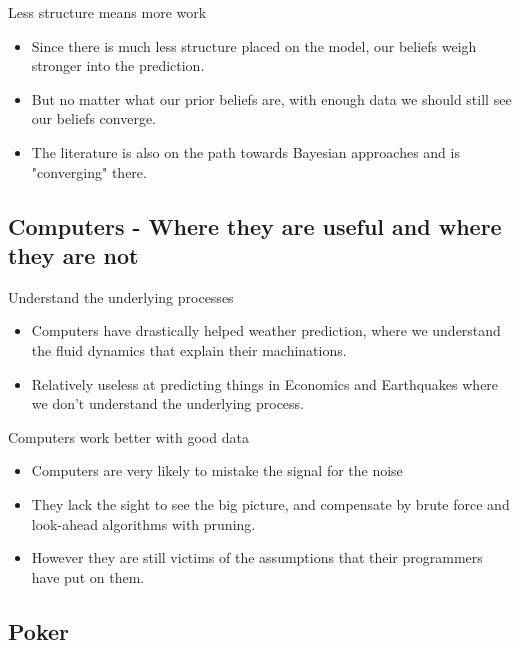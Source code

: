 \documentclass[bigger]{beamer}
\begin{document}
\begin{frame}[label=sec-4-1-4]{Less structure means more work}
\begin{itemize}
\item Since there is much less structure placed on the model, our beliefs
weigh stronger into the prediction.
\item But no matter what our prior beliefs are, with enough data we should
still see our beliefs converge.
\item The literature is also on the path towards Bayesian approaches and
is "converging" there.
\end{itemize}
\end{frame}

\subsection{Computers - Where they are useful and where they are not}
\label{sec-4-2}

\begin{frame}[label=sec-4-2-1]{Understand the underlying processes}
\begin{itemize}
\item Computers have drastically helped weather prediction, where we
understand the fluid dynamics that explain their machinations.
\item Relatively useless at predicting things in Economics and Earthquakes
where we don't understand the underlying process.
\end{itemize}
\end{frame}

\begin{frame}[label=sec-4-2-2]{Computers work better with good data}
\begin{itemize}
\item Computers are very likely to mistake the signal for the noise
\item They lack the sight to see the big picture, and compensate by brute
force and look-ahead algorithms with pruning.
\item However they are still victims of the assumptions that their
programmers have put on them.
\end{itemize}
\end{frame}

\subsection{Poker}
\label{sec-4-3}
\end{document}

